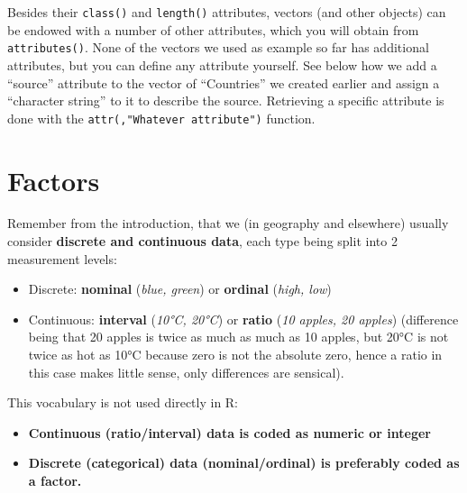 \documentclass[
  letterpaper,
  DIV=11,
  numbers=noendperiod]{scrreprt}
\newenvironment{Shaded}{\begin{snugshade}}{\end{snugshade}}
\newcommand{\CommentTok}[1]{\textcolor[rgb]{0.37,0.37,0.37}{#1}}
\newcommand{\FunctionTok}[1]{\textcolor[rgb]{0.28,0.35,0.67}{#1}}
\newcommand{\NormalTok}[1]{\textcolor[rgb]{0.00,0.23,0.31}{#1}}
\newcommand{\OtherTok}[1]{\textcolor[rgb]{0.00,0.23,0.31}{#1}}
\newcommand{\StringTok}[1]{\textcolor[rgb]{0.13,0.47,0.30}{#1}}
\begin{document}
Besides their \texttt{class()} and \texttt{length()} attributes, vectors
(and other objects) can be endowed with a number of other attributes,
which you will obtain from \texttt{attributes()}. None of the vectors we
used as example so far has additional attributes, but you can define any
attribute yourself. See below how we add a ``source'' attribute to the
vector of ``Countries'' we created earlier and assign a ``character
string'' to it to describe the source. Retrieving a specific attribute
is done with the \texttt{attr(,"Whatever\ attribute")} function.

\begin{Shaded}
\end{Shaded}

\section{Factors}\label{sec-factors}

Remember from the introduction, that we (in geography and elsewhere)
usually consider \textbf{discrete and continuous data}, each type being
split into 2 measurement levels:

\begin{itemize}
\item
  Discrete: \textbf{nominal} (\emph{blue, green}) or \textbf{ordinal}
  (\emph{high, low})
\item
  Continuous: \textbf{interval} (\emph{10°C, 20°C}) or \textbf{ratio}
  (\emph{10 apples, 20 apples}) (difference being that 20 apples is
  twice as much as much as 10 apples, but 20°C is not twice as hot as
  10°C because zero is not the absolute zero, hence a ratio in this case
  makes little sense, only differences are sensical).
\end{itemize}

This vocabulary is not used directly in R:

\begin{itemize}
\item
  \textbf{Continuous (ratio/interval) data is coded as numeric or
  integer}
\item
  \textbf{Discrete (categorical) data (nominal/ordinal) is preferably
  coded as a factor.}
\end{itemize}
\end{document}
